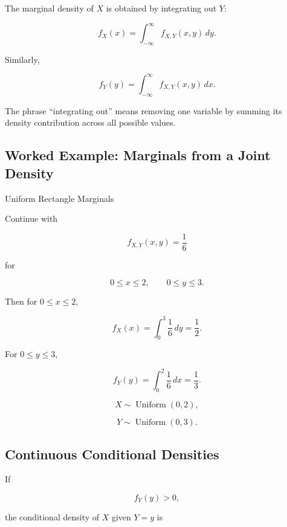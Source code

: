 The marginal density of \(X\) is obtained by integrating out \(Y\):

\[
\boxed{
f_X(x)
=
\int_{-\infty}^{\infty}
f_{X,Y}(x,y)\,dy.
}
\]

Similarly,

\[
\boxed{
f_Y(y)
=
\int_{-\infty}^{\infty}
f_{X,Y}(x,y)\,dx.
}
\]

The phrase ``integrating out'' means removing one variable by summing
its density contribution across all possible values.

\subsection{Worked Example: Marginals from a Joint Density}
\label{subsec:worked-continuous-marginals}

\begin{workedexamplebox}{Uniform Rectangle Marginals}

Continue with

\[
f_{X,Y}(x,y)
=
\frac16
\]

for

\[
0\leq x\leq2,
\qquad
0\leq y\leq3.
\]

Then for \(0\leq x\leq2\),

\[
f_X(x)
=
\int_0^3
\frac16\,dy
=
\frac12.
\]

For \(0\leq y\leq3\),

\[
f_Y(y)
=
\int_0^2
\frac16\,dx
=
\frac13.
\]

\begin{answerbox}
\[
\boxed{
X\sim\operatorname{Uniform}(0,2),
}
\]

\[
\boxed{
Y\sim\operatorname{Uniform}(0,3).
}
\]
\end{answerbox}

\end{workedexamplebox}

\subsection{Continuous Conditional Densities}
\label{subsec:continuous-conditional-densities}

If

\[
f_Y(y)>0,
\]

the conditional density of \(X\) given \(Y=y\) is

